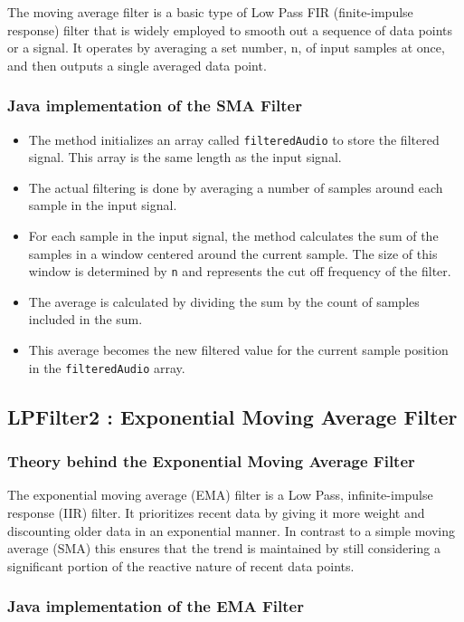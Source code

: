 The moving average filter is a basic type of Low Pass FIR (finite-impulse response) filter that is widely employed to smooth out a sequence of data points or a signal. It operates by averaging a set number, n, of input samples at once, and then outputs a single averaged data point.

\subsubsection{Java implementation of the SMA Filter}

\begin{itemize}
	\item The method initializes an array called \texttt{filteredAudio} to store the filtered signal. This array is the same length as the input signal.
	\item The actual filtering is done by averaging a number of samples around each sample in the input signal. 
	\item For each sample in the input signal, the method calculates the sum of the samples in a window centered around the current sample. The size of this window is determined by \texttt{n} and represents the cut off frequency of the filter.
	\item The average is calculated by dividing the sum by the count of samples included in the sum.
	\item This average becomes the new filtered value for the current sample position in the \texttt{filteredAudio} array.
\end{itemize}

\subsection{LPFilter2 : Exponential Moving Average Filter}

\subsubsection{Theory behind the Exponential Moving Average Filter}

The exponential moving average (EMA) filter is a Low Pass, infinite-impulse response (IIR) filter. It prioritizes recent data by giving it more weight and discounting older data in an exponential manner. In contrast to a simple moving average (SMA) this ensures that the trend is maintained by still considering a significant portion of the reactive nature of recent data points.

\subsubsection{Java implementation of the EMA Filter}


